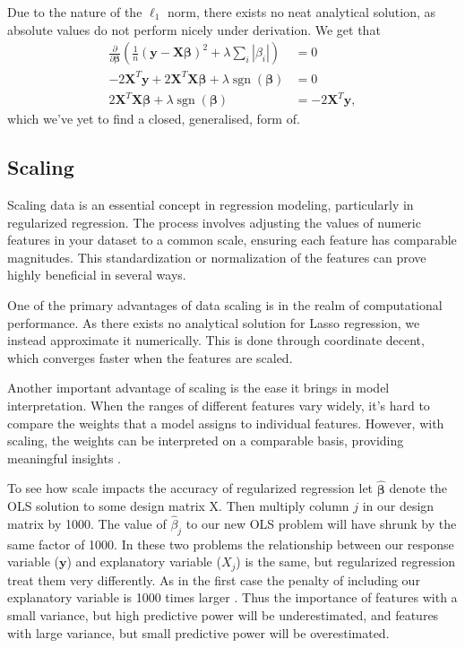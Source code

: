 \documentclass{article}
\DeclareMathOperator*{\sgn}{sgn}
\begin{document}
Due to the nature of the $\ell_1$ norm, there exists no neat analytical solution, as absolute values do not perform nicely under derivation. We get that
\begin{align*}
    \frac{\partial}{\partial \boldsymbol{\beta}} \left( \frac{1}{n} \left( \boldsymbol{y} - \textbf{X} \boldsymbol{\beta} \right)^2 + \lambda \sum_i |\beta_i| \right) &= 0 \\
    -2 \textbf{X}^T \boldsymbol{y} + 2 \textbf{X}^T \textbf{X} \boldsymbol{\beta} + \lambda \sgn(\boldsymbol{\beta}) &= 0 \\
    2 \textbf{X}^T \textbf{X} \boldsymbol{\beta} + \lambda \sgn(\boldsymbol{\beta}) &= -2 \textbf{X}^T \boldsymbol{y},
\end{align*}
which we've yet to find a closed, generalised, form of.

\subsection{Scaling}
Scaling data is an essential concept in regression modeling, particularly in regularized regression. The process involves adjusting the values of numeric features in your dataset to a common scale, ensuring each feature has comparable magnitudes.
This standardization or normalization of the features can prove highly beneficial in several ways.

One of the primary advantages of data scaling is in the realm of computational performance. As there exists no analytical solution for Lasso regression, we instead approximate it numerically. This is done through coordinate decent, which converges faster when the features are scaled.

Another important advantage of scaling is the ease it brings in model interpretation. When the ranges of different features vary widely, it's hard to compare the weights that a model assigns to individual features. However, with scaling, the weights can be interpreted on a comparable basis, providing meaningful insights \cite[p.~237]{james2021introduction}.

To see how scale impacts the accuracy of regularized regression let $\boldsymbol{\hat{\beta}}$ denote the OLS solution to some design matrix X. Then multiply column $j$ in our design matrix by 1000. The value of $\hat{\beta}_j$ to our new OLS problem will have shrunk by the same factor of 1000. In these two problems the relationship between our response variable ($\boldsymbol{y}$) and explanatory variable ($X_j$) is the same, but regularized regression treat them very differently. As in the first case the penalty of including our explanatory variable is 1000 times larger \cite[p.~237]{james2021introduction}. Thus the importance of features with a small variance, but high predictive power will be underestimated, and features with large variance, but small predictive power will be overestimated.
\end{document}
